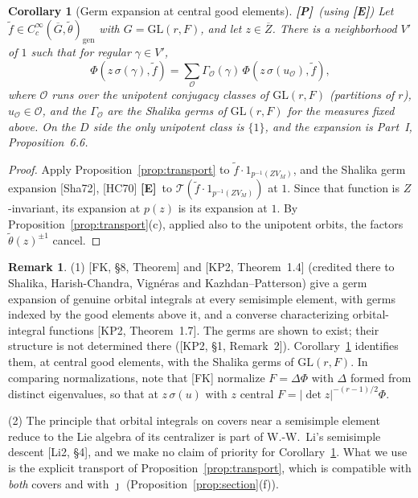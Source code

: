 \documentclass[12pt]{article}
\newcommand{\ov}[1]{\overline{#1}}
\newcommand{\gen}{\mathrm{gen}}
\newcommand{\GL}{\mathrm{GL}}
\newcommand{\Gb}{\ov{G}}
\newcommand{\Zb}{\ov{Z}}
\newcommand{\jj}{\jmath}
\newcommand{\sg}{\sigma}
\newcommand{\Pv}{\textbf{[P]}}
\newcommand{\Ev}{\textbf{[E]}}
\theoremstyle{plain}
\newtheorem{corollary}[theorem]{Corollary}
\theoremstyle{definition}
\newtheorem{remark}[theorem]{Remark}
\begin{document}
\begin{corollary}[Germ expansion at central good elements]\label{cor:germexp}\Pv\ (using \Ev)
Let $\tilde f\in C_c^\infty(\Gb,\tilde\theta)_\gen$ with $G=\GL(r,F)$, and let $z\in\Zb$. There is a neighborhood $V'$ of $1$ such that for regular $\gamma\in V'$,
\[ \Phi(z\,\sg(\gamma),\tilde f)=\sum_{\mathcal O}\Gamma_{\mathcal O}(\gamma)\,\Phi(z\,\sg(u_{\mathcal O}),\tilde f), \]
where $\mathcal O$ runs over the unipotent conjugacy classes of $\GL(r,F)$ (partitions of $r$), $u_{\mathcal O}\in\mathcal O$, and the $\Gamma_{\mathcal O}$ are the Shalika germs of $\GL(r,F)$ for the measures fixed above. On the $D$ side the only unipotent class is $\{1\}$, and the expansion is Part~I, Proposition~6.6.
\end{corollary}
\begin{proof}
Apply Proposition~\ref{prop:transport} to $\tilde f\cdot1_{p^{-1}(ZV_M)}$, and the Shalika germ expansion [Sha72], [HC70] \Ev\ to $\mathcal T(\tilde f\cdot1_{p^{-1}(ZV_M)})$ at $1$. Since that function is $Z$-invariant, its expansion at $p(z)$ is its expansion at $1$. By Proposition~\ref{prop:transport}(c), applied also to the unipotent orbits, the factors $\tilde\theta(z)^{\pm1}$ cancel.
\end{proof}



\begin{remark}\label{rem:FK8}
(1) [FK, \S8, Theorem] and [KP2, Theorem~1.4] (credited there to Shalika, Harish-Chandra, Vign\'eras and Kazhdan--Patterson) give a germ expansion of genuine orbital integrals at every semisimple element, with germs indexed by the good elements above it, and a converse characterizing orbital-integral functions [KP2, Theorem~1.7]. The germs are shown to exist; their structure is not determined there ([KP2, \S1, Remark~2]). Corollary~\ref{cor:germexp} identifies them, at central good elements, with the Shalika germs of $\GL(r,F)$. In comparing normalizations, note that [FK] normalize $F=\Delta\Phi$ with $\Delta$ formed from distinct eigenvalues, so that at $z\,\sg(u)$ with $z$ central $F=|\det z|^{-(r-1)/2}\Phi$.

(2) The principle that orbital integrals on covers near a semisimple element reduce to the Lie algebra of its centralizer is part of W.-W.~Li's semisimple descent [Li2, \S4], and we make no claim of priority for Corollary~\ref{cor:germexp}. What we use is the explicit transport of Proposition~\ref{prop:transport}, which is compatible with \emph{both} covers and with $\jj$ (Proposition~\ref{prop:section}(f)).
\end{remark}
\end{document}
